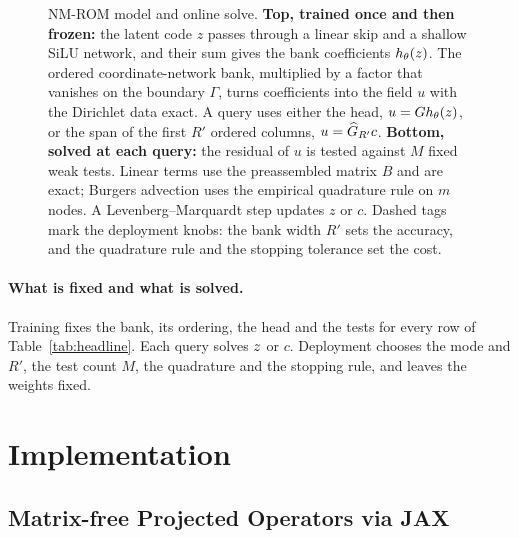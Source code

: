 \documentclass{article}
\begin{document}
\begin{figure}[H]
\centering
\setlength{\intextsep}{2pt plus 1pt minus 1pt}
\setlength{\abovecaptionskip}{2pt}
\setlength{\belowcaptionskip}{0pt}
\resizebox{\linewidth}{!}{}
\caption{NM-ROM model and online solve. \textbf{Top, trained once and then
frozen:} the latent code $z$ passes through a linear skip and a shallow
SiLU network, and their sum gives the bank coefficients $h_\theta(z)$. The
ordered coordinate-network bank, multiplied by a factor that vanishes on
the boundary $\Gamma$, turns coefficients into the field $u$ with the
Dirichlet data exact. A query uses either the head, $u=Gh_\theta(z)$, or
the span of the first $R'$ ordered columns, $u=\widehat{G}_{R'}c$.
\textbf{Bottom, solved at each query:} the residual of $u$ is tested
against $M$ fixed weak tests. Linear terms use the preassembled matrix $B$
and are exact; Burgers advection uses the empirical quadrature rule on $m$
nodes. A Levenberg--Marquardt step updates $z$ or $c$. Dashed tags mark
the deployment knobs: the bank width $R'$ sets the accuracy, and the
quadrature rule and the stopping tolerance set the cost.}
\label{fig:decoder}
\end{figure}

\paragraph{What is fixed and what is solved.}
\label{sec:method:tuning}\label{sec:method:layers}
Training fixes the bank, its ordering, the head and the tests for every
row of Table~\ref{tab:headline}. Each query solves $z$ or $c$.
Deployment chooses the mode and $R'$, the test count $M$, the quadrature
and the stopping rule, and leaves the weights fixed.

\section{Implementation}
\label{sec:impl}

\subsection{Matrix-free Projected Operators via JAX}
\end{document}
